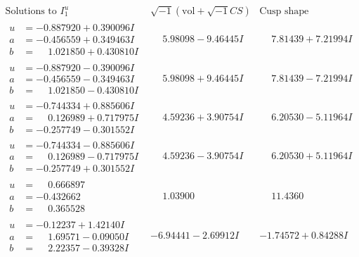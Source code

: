 \documentclass[1p]{elsarticle_modified}
\theoremstyle{definition}
\newcommand{\I}{\sqrt{-1}}
\begin{document}
$$\begin{array}{c|c|c}  
\text{Solutions to }I^u_{1}& \I (\text{vol} + \sqrt{-1}CS) & \text{Cusp shape}\\
 \hline 
\begin{aligned}
u &= -0.887920 + 0.390096 I \\
a &= -0.456559 + 0.349463 I \\
b &= \phantom{-}1.021850 + 0.430810 I\end{aligned}
 & \phantom{-}5.98098 - 9.46445 I & \phantom{-}7.81439 + 7.21994 I \\ \hline\begin{aligned}
u &= -0.887920 - 0.390096 I \\
a &= -0.456559 - 0.349463 I \\
b &= \phantom{-}1.021850 - 0.430810 I\end{aligned}
 & \phantom{-}5.98098 + 9.46445 I & \phantom{-}7.81439 - 7.21994 I \\ \hline\begin{aligned}
u &= -0.744334 + 0.885606 I \\
a &= \phantom{-}0.126989 + 0.717975 I \\
b &= -0.257749 - 0.301552 I\end{aligned}
 & \phantom{-}4.59236 + 3.90754 I & \phantom{-}6.20530 - 5.11964 I \\ \hline\begin{aligned}
u &= -0.744334 - 0.885606 I \\
a &= \phantom{-}0.126989 - 0.717975 I \\
b &= -0.257749 + 0.301552 I\end{aligned}
 & \phantom{-}4.59236 - 3.90754 I & \phantom{-}6.20530 + 5.11964 I \\ \hline\begin{aligned}
u &= \phantom{-}0.666897\phantom{ +0.000000I} \\
a &= -0.432662\phantom{ +0.000000I} \\
b &= \phantom{-}0.365528\phantom{ +0.000000I}\end{aligned}
 & \phantom{-}1.03900\phantom{ +0.000000I} & \phantom{-}11.4360\phantom{ +0.000000I} \\ \hline\begin{aligned}
u &= -0.12237 + 1.42140 I \\
a &= \phantom{-}1.69571 - 0.09050 I \\
b &= \phantom{-}2.22357 - 0.39328 I\end{aligned}
 & -6.94441 - 2.69912 I & -1.74572 + 0.84288 I \\ \hline\begin{aligned}

\end{aligned}
\end{array}$$
\end{document}
